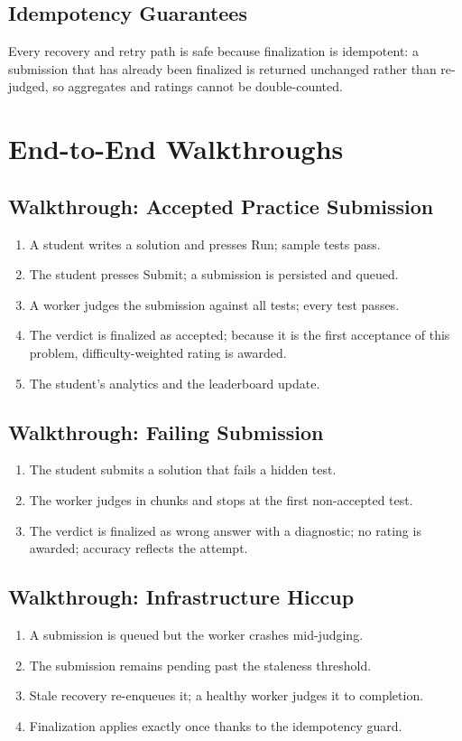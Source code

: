 \documentclass[12pt,a4paper,oneside]{report}
\begin{document}
\section{Idempotency Guarantees}
Every recovery and retry path is safe because finalization is idempotent: a
submission that has already been finalized is returned unchanged rather than
re-judged, so aggregates and ratings cannot be double-counted.

\chapter{End-to-End Walkthroughs}
\section{Walkthrough: Accepted Practice Submission}
\begin{enumerate}[leftmargin=1.6em]
  \item A student writes a solution and presses Run; sample tests pass.
  \item The student presses Submit; a submission is persisted and queued.
  \item A worker judges the submission against all tests; every test passes.
  \item The verdict is finalized as accepted; because it is the first acceptance
        of this problem, difficulty-weighted rating is awarded.
  \item The student's analytics and the leaderboard update.
\end{enumerate}

\section{Walkthrough: Failing Submission}
\begin{enumerate}[leftmargin=1.6em]
  \item The student submits a solution that fails a hidden test.
  \item The worker judges in chunks and stops at the first non-accepted test.
  \item The verdict is finalized as wrong answer with a diagnostic; no rating is
        awarded; accuracy reflects the attempt.
\end{enumerate}

\section{Walkthrough: Infrastructure Hiccup}
\begin{enumerate}[leftmargin=1.6em]
  \item A submission is queued but the worker crashes mid-judging.
  \item The submission remains pending past the staleness threshold.
  \item Stale recovery re-enqueues it; a healthy worker judges it to completion.
  \item Finalization applies exactly once thanks to the idempotency guard.
\end{enumerate}
\end{document}

